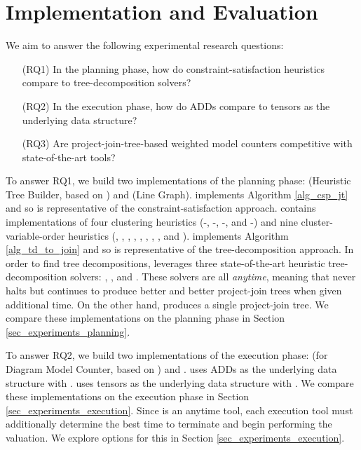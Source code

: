 \section{Implementation and Evaluation}
\label{sec_experiments}

We aim to answer the following experimental research questions:
\begin{itemize}
    \item[(RQ1)] In the planning phase, how do constraint-satisfaction heuristics compare to tree-decomposition solvers?
    \item[(RQ2)] In the execution phase, how do ADDs compare to tensors as the underlying data structure?
    \item[(RQ3)] Are project-join-tree-based weighted model counters competitive with state-of-the-art tools?
\end{itemize}

To answer RQ1, we build two implementations of the planning phase: \Htb{} (Heuristic Tree Builder, based on \cite{DPV20}) and \Lg{} (Line Graph).
\Htb{} implements Algorithm \ref{alg_csp_jt} and so is representative of the constraint-satisfaction approach.
\Htb{} contains implementations of four clustering heuristics (\Be-\ListH, \Be-\TreeH, \Bm-\ListH, and \Bm-\TreeH) and nine cluster-variable-order heuristics (\Random, \Mcs, \Invmcs, \Lexp, \Invlexp, \Lexm, \Invlexm, \Minfill, and \Invminfill).
\Lg{} implements Algorithm \ref{alg_td_to_join} and so is representative of the tree-decomposition approach.
In order to find tree decompositions, \Lg{} leverages three state-of-the-art heuristic tree-decomposition solvers: \Flowcutter{} \cite{strasser2017computing}, \Htd{} \cite{AMW17}, and \Tamaki{} \cite{Tamaki17}.
These solvers are all \emph{anytime}, meaning that \Lg{} never halts but continues to produce better and better project-join trees when given additional time.
On the other hand, \Htb{} produces a single project-join tree.
We compare these implementations on the planning phase in Section \ref{sec_experiments_planning}.

To answer RQ2, we build two implementations of the execution phase: \Dmc{} (for Diagram Model Counter, based on \cite{DPV20}) and \Tensor{}.
\Dmc{} uses ADDs as the underlying data structure with \cudd{} \cite{somenzi2015cudd}.
\Tensor{} uses tensors as the underlying data structure with \Numpy{} \cite{numpy}.
We compare these implementations on the execution phase in Section \ref{sec_experiments_execution}.
Since \Lg{} is an anytime tool, each execution tool must additionally determine the best time to terminate \Lg{} and begin performing the valuation.
We explore options for this in Section \ref{sec_experiments_execution}.

